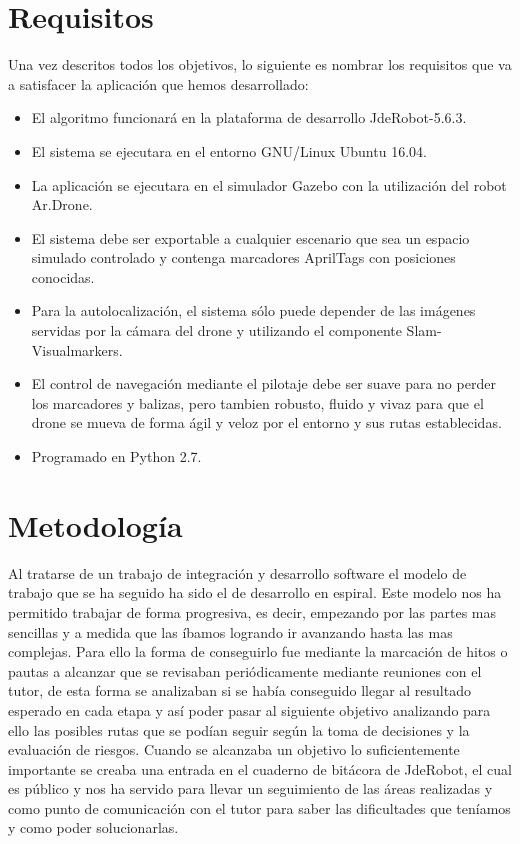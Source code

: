 \section{Requisitos}
\hspace{1cm} Una vez descritos todos los objetivos, lo siguiente es nombrar los requisitos que va a satisfacer la aplicación que hemos desarrollado:

\begin{itemize}
		\item El algoritmo funcionará en la plataforma de desarrollo JdeRobot-5.6.3.
		\item El sistema se ejecutara en el entorno GNU/Linux Ubuntu 16.04.
		\item La aplicación se ejecutara en el simulador Gazebo con la utilización del robot Ar.Drone.
		\item El sistema debe ser exportable a cualquier escenario que sea un espacio simulado controlado y contenga marcadores AprilTags con posiciones conocidas.
		\item Para la autolocalización, el sistema sólo puede depender de las imágenes servidas por la cámara del drone y utilizando el componente Slam-Visualmarkers.
		\item El control de navegación mediante el pilotaje debe ser suave para no perder los marcadores y balizas, pero tambien robusto, fluido y vivaz para que el drone se mueva de forma ágil y veloz por el entorno y sus rutas establecidas.
		\item Programado en Python 2.7.
\end{itemize}


\section{Metodología}
\hspace{1cm} Al tratarse de un trabajo de integración y desarrollo software el modelo de trabajo que se ha seguido ha sido el de desarrollo en espiral. Este modelo nos ha permitido trabajar de forma progresiva, es decir, empezando por las partes mas sencillas y a medida que las íbamos logrando ir avanzando hasta las mas complejas. Para ello la forma de conseguirlo fue mediante la marcación de hitos o pautas a alcanzar que se revisaban periódicamente mediante reuniones con el tutor, de esta forma se analizaban si se había conseguido llegar al resultado esperado en cada etapa y así poder pasar al siguiente objetivo analizando para ello las posibles rutas que se podían seguir según la toma de decisiones y la evaluación de riesgos. Cuando se alcanzaba un objetivo lo suficientemente importante se creaba una entrada en el cuaderno de bitácora de JdeRobot, el cual es público y nos ha servido para llevar un seguimiento de las áreas realizadas y como punto de comunicación con el tutor para saber las dificultades que teníamos y como poder solucionarlas.  

